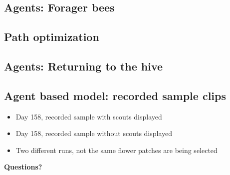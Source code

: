\documentclass[
	paper=128mm:96mm,
	fontsize=11pt,
	pagesize,
	parskip=half-,
]{scrartcl}
\theoremstyle{mythmstyle} %
\begin{document}

\subsection{Agents: Forager bees}
	
	\clearpage


\subsection{Path optimization}
	
	\clearpage


\subsection{Agents: Returning to the hive}
	
	\clearpage


\subsection{Agent based model: recorded sample clips}
	\begin{itemize}
		\item Day 158, recorded sample with scouts displayed
		\item Day 158, recorded sample without scouts displayed
		\item Two different runs, not the same flower patches are being selected
	\end{itemize}
	\clearpage


\thispagestyle{empty}

\printbibliography[heading=none]

\clearpage


\thispagestyle{empty}


\begin{flushright}
	\vspace{0.6cm}
	\color{white}\sffamily
	{\bfseries\LARGE Questions?\par}
	\vfill
\end{flushright}

\end{document}
